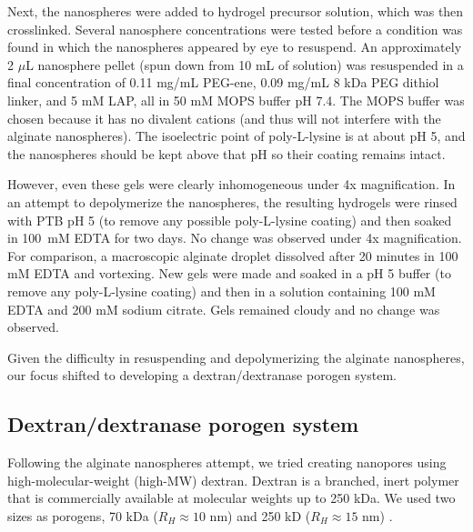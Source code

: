 Next, the nanospheres were added to hydrogel precursor solution, which was then crosslinked.  Several nanosphere concentrations were tested before a condition was found in which the nanospheres appeared by eye to resuspend.  An approximately 2 $\mu$L nanosphere pellet (spun down from 10 mL of solution) was resuspended in a final concentration of 0.11 mg/mL PEG-ene, 0.09 mg/mL 8 kDa PEG dithiol linker, and 5 mM LAP, all in 50 mM MOPS buffer pH 7.4.  The MOPS buffer was chosen because it has no divalent cations (and thus will not interfere with the alginate nanospheres).  The isoelectric point of poly-L-lysine is at about pH 5, and the nanospheres should be kept above that pH so their coating remains intact.

However, even these gels were clearly inhomogeneous under 4x magnification.  In an attempt to depolymerize the nanospheres, the resulting hydrogels were rinsed with PTB pH 5 (to remove any possible poly-L-lysine coating) and then soaked in 100~mM EDTA for two days.  No change was observed under 4x magnification.  For comparison, a macroscopic alginate droplet dissolved after 20 minutes in 100 mM EDTA and vortexing.  New gels were made and soaked in a pH 5 buffer (to remove any poly-L-lysine coating) and then in a solution containing 100 mM EDTA and 200 mM sodium citrate.  Gels remained cloudy and no change was observed.

Given the difficulty in resuspending and depolymerizing the alginate nanospheres, our focus shifted to developing a dextran/dextranase porogen system.

\subsection{Dextran/dextranase porogen system}
Following the alginate nanospheres attempt, we tried creating nanopores using high-molecular-weight (high-MW) dextran.  Dextran is a branched, inert polymer that is commercially available at molecular weights up to 250 kDa.  We used two sizes as porogens, 70 kDa ($R_H \approx 10$ nm) and 250 kD ($R_H \approx 15$ nm) \cite{masuelli13}.  

